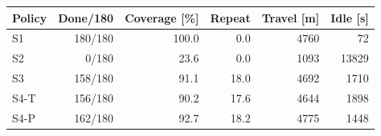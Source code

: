 \begin{tabular}{lrrrrr}\toprule
Policy & Done/180 & Coverage [\%] & Repeat & Travel [m] & Idle [s]\\\midrule
S1 & 180/180 & 100.0 & 0.0 & 4760 & 72\\
S2 & 0/180 & 23.6 & 0.0 & 1093 & 13829\\
S3 & 158/180 & 91.1 & 18.0 & 4692 & 1710\\
S4-T & 156/180 & 90.2 & 17.6 & 4644 & 1898\\
S4-P & 162/180 & 92.7 & 18.2 & 4775 & 1448\\
\bottomrule\end{tabular}

